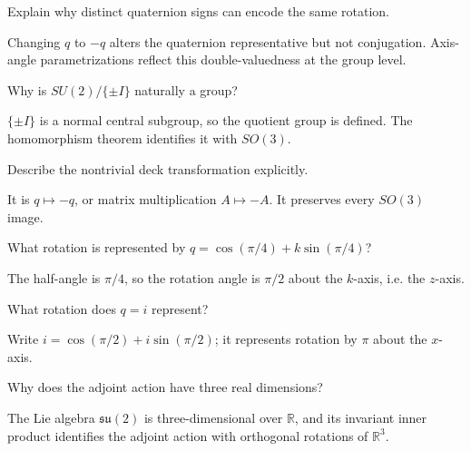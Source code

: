 \begin{problem}\label{prob:viii13-14}
Explain why distinct quaternion signs can encode the same rotation.
\end{problem}
\begin{solution}
Changing \(q\) to \(-q\) alters the quaternion representative but not conjugation. Axis-angle parametrizations reflect this double-valuedness at the group level.
\end{solution}

\begin{problem}\label{prob:viii13-15}
Why is \(SU(2)/\{\pm I\}\) naturally a group?
\end{problem}
\begin{solution}
\(\{\pm I\}\) is a normal central subgroup, so the quotient group is defined. The homomorphism theorem identifies it with \(SO(3)\).
\end{solution}

\begin{problem}\label{prob:viii13-16}
Describe the nontrivial deck transformation explicitly.
\end{problem}
\begin{solution}
It is \(q\mapsto -q\), or matrix multiplication \(A\mapsto -A\). It preserves every \(SO(3)\) image.
\end{solution}

\begin{problem}\label{prob:viii13-17}
What rotation is represented by \(q=\cos(\pi/4)+k\sin(\pi/4)\)?
\end{problem}
\begin{solution}
The half-angle is \(\pi/4\), so the rotation angle is \(\pi/2\) about the \(k\)-axis, i.e. the \(z\)-axis.
\end{solution}

\begin{problem}[Quaternion \(i\)]\label{prob:viii13-18}
What rotation does \(q=i\) represent?
\end{problem}
\begin{solution}
Write \(i=\cos(\pi/2)+i\sin(\pi/2)\); it represents rotation by \(\pi\) about the \(x\)-axis.
\end{solution}

\begin{problem}\label{prob:viii13-19}
Why does the adjoint action have three real dimensions?
\end{problem}
\begin{solution}
The Lie algebra \(\mathfrak{su}(2)\) is three-dimensional over \(\mathbb R\), and its invariant inner product identifies the adjoint action with orthogonal rotations of \(\mathbb R^3\).
\end{solution}

